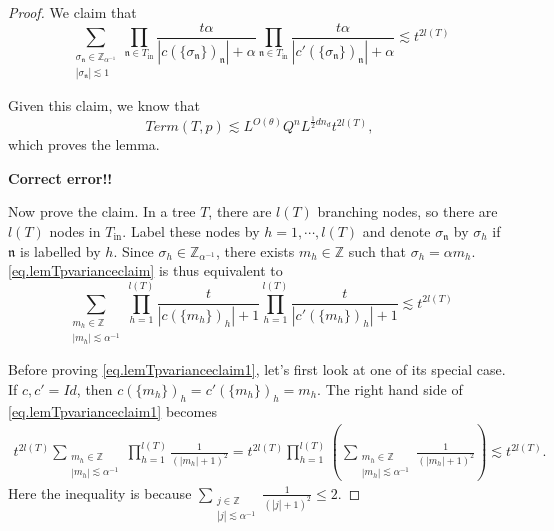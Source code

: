 \begin{proof}
We claim that 
\begin{equation}\label{eq.lemTpvarianceclaim}
     \sum_{\substack{\sigma_{\mathfrak{n}}\in \mathbb{Z}_{\alpha^{-1}}\\ |\sigma_{\mathfrak{n}}|\lesssim 1}} \prod_{\mathfrak{n}\in T_{\text{in}}}\frac{t\alpha}{|c(\{\sigma_{\mathfrak{n}}\})_{\mathfrak{n}}|+\alpha} \prod_{\mathfrak{n}\in T_{\text{in}}}\frac{t\alpha}{|c'(\{\sigma_{\mathfrak{n}}\})_{\mathfrak{n}}|+\alpha}\lesssim t^{2l(T)}
\end{equation}

Given this claim, we know that 
\begin{equation}
    Term(T, p)\lesssim L^{O(\theta)} Q^{n} L^{\frac{1}{2} dn_d} t^{2l(T)},
\end{equation}
which proves the lemma.

\textbf{Correct error!!}

Now prove the claim. In a tree $T$, there are $l(T)$ branching nodes, so there are $l(T)$ nodes in $T_{\text{in}}$. Label these nodes by $h=1,\cdots,l(T)$ and denote $\sigma_{\mathfrak{n}}$ by $\sigma_{h}$ if $\mathfrak{n}$ is labelled by $h$. Since $\sigma_{h}\in \mathbb{Z}_{\alpha^{-1}}$, there exists $m_{h}\in \mathbb{Z}$ such that $\sigma_{h}=\alpha m_{h}$. \eqref{eq.lemTpvarianceclaim} is thus equivalent to 
\begin{equation}\label{eq.lemTpvarianceclaim1}
    \sum_{\substack{m_{h}\in \mathbb{Z}\\ |m_{h}|\lesssim \alpha^{-1}}} \prod_{h=1}^{l(T)}\frac{t}{|c(\{m_{h}\})_{h}|+1} \prod_{h=1}^{l(T)}\frac{t}{|c'(\{m_{h}\})_{h}|+1}\lesssim t^{2l(T)}
\end{equation}

Before proving \eqref{eq.lemTpvarianceclaim1}, let's first look at one of its special case. If $c,c'=Id$, then $c(\{m_{h}\})_{h}=c'(\{m_{h}\})_{h}=m_h$. The right hand side of \eqref{eq.lemTpvarianceclaim1} becomes
\begin{equation}
\begin{split}
    t^{2l(T)}\sum_{\substack{m_{h}\in \mathbb{Z}\\ |m_{h}|\lesssim \alpha^{-1}}} \prod_{h=1}^{l(T)}\frac{1}{(|m_{h}|+1)^2} = t^{2l(T)}\prod_{h=1}^{l(T)}\left(\sum_{\substack{m_{h}\in \mathbb{Z}\\ |m_{h}|\lesssim \alpha^{-1}}} \frac{1}{(|m_{h}|+1)^2}\right)
    \lesssim t^{2l(T)}.
\end{split}
\end{equation}
Here the inequality is because $\sum_{\substack{j\in \mathbb{Z}\\ |j|\lesssim \alpha^{-1}}} \frac{1}{(|j|+1)^2}\le 2$.


\end{proof}
